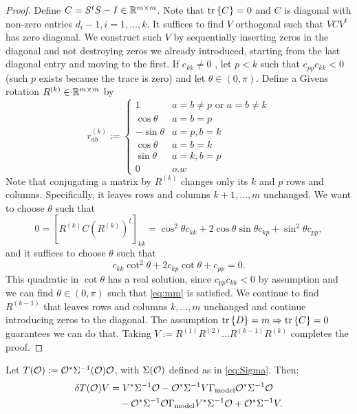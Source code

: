 \documentclass{amsart}
\numberwithin{equation}{section}
\begin{document}
\begin{proof}
  Define $C = S^tS - I \in \mathbb{R}^{m \times m}$. Note that $\textup{tr}\left \{C \right \} = 0$ and
  $C$ is diagonal with non-zero entries $d_i-1,i=1,\dots,k$. It suffices
  to find $V$ orthogonal such that $V C V^t$ has zero diagonal. We
  construct such $V$ by sequentially inserting zeros in the diagonal
  and not destroying zeros we already introduced, starting from the
  last diagonal entry and moving to the first. If $c_{kk} \neq 0$ ,
  let $p < k$ such that $c_{pp}c_{kk} < 0$ (such $p$ exists because
  the trace is zero) and let $\theta \in (0,\pi)$. Define a Givens
  rotation $R^{(k)} \in \mathbb{R}^{m \times m}$ by
  \begin{equation*}
    r^{(k)}_{ab} :=
    \begin{cases}
      1 & a = b \neq p \text{ or } a = b \neq k \\
      \cos \theta & a = b = p  \\
     -\sin \theta & a = p, b = k\\
      \cos \theta & a = b = k \\
      \sin \theta & a = k, b = p \\ 
      0 & o.w
    \end{cases}
  \end{equation*}
  Note that conjugating a matrix by $R^{(k)}$ changes only its $k$ and
  $p$ rows and columns. Specifically, it leaves rows and columns
  $k+1,\dots,m$ unchanged. We want to choose $\theta$ such that
  \begin{equation}\label{eq:mm}
    0 = [R^{(k)} C (R^{(k)})^t]_{kk} = \cos^2 \theta c_{kk} + 2\cos \theta \sin
    \theta c_{kp} + \sin^2\theta c_{pp},
  \end{equation}
  and it suffices to choose $\theta$ such that
  \begin{equation*}
    c_{kk} \cot^2 \theta + 2 c_{kp} \cot \theta + c_{pp} = 0.
  \end{equation*}
  This quadratic in $\cot\theta$ has a real solution, since
  $c_{pp}c_{kk} < 0$ by assumption and we can find $\theta \in
  (0,\pi)$ such that \eqref{eq:mm} is satisfied. We continue to find
  $R^{(k-1)}$ that leaves rows and columns $k,\dots,m$ unchanged and
  continue introducing zeros to the diagonal. The assumption $\textup{tr}\left \{D \right \} =
  m \Rightarrow \textup{tr}\left \{C \right \} = 0$ guarantees we can do that. Taking $V:=
  R^{(1)} R^{(2)} \dots R^{(k-1)}R^{(k)}$ completes the proof.
\end{proof}

\begin{lemma}\label{lemma:aux calc}
  Let $T(\mathcal{O}) := \mathcal{O}^* \Sigma^{-1}(\mathcal{O})\mathcal{O}$, with $\Sigma(\mathcal{O})$
  defined as in \eqref{eq:Sigma}. Then:
  \begin{align*}
    \delta T(\mathcal{O})V &= V^* \Sigma^{-1} \mathcal{O} 
    - \mathcal{O}^*\Sigma^{-1} V\Gamma_{\textup{model}} \mathcal{O}^* \Sigma^{-1}\mathcal{O} \\
    &\ \ \ - \mathcal{O}^* \Sigma^{-1} \mathcal{O} \Gamma_{\textup{model}} V^* \Sigma^{-1}\mathcal{O}
    + \mathcal{O}^* \Sigma^{-1} V.
  \end{align*}
\end{lemma}
\end{document}
